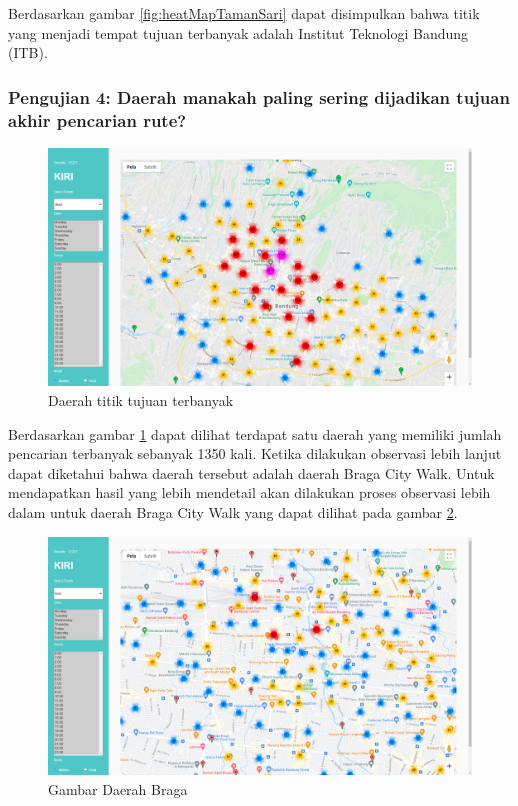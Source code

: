 Berdasarkan gambar \ref{fig:heatMapTamanSari} dapat disimpulkan bahwa titik yang menjadi tempat tujuan terbanyak adalah Institut Teknologi Bandung (ITB).

\subsubsection{Pengujian 4: Daerah manakah paling sering dijadikan tujuan akhir pencarian rute?}
\label{subsec:pengujian4}
\begin{figure}[H]
	\centering  
	\includegraphics[scale=0.3]{Gambar/pengujian/titik-tujuan-terbanyak.png}  
	\caption[Daerah titik tujuan terbanyak]{Daerah titik tujuan terbanyak} 
	\label{fig:titikTujuan}
\end{figure}

Berdasarkan gambar \ref{fig:titikTujuan} dapat dilihat terdapat satu daerah yang memiliki jumlah pencarian terbanyak sebanyak 1350 kali. Ketika dilakukan observasi lebih lanjut dapat diketahui bahwa daerah tersebut adalah daerah Braga City Walk. Untuk mendapatkan hasil yang lebih mendetail akan dilakukan proses observasi lebih dalam untuk daerah Braga City Walk yang dapat dilihat pada gambar \ref{fig:bragaZoom}.

\begin{figure}[H]
	\centering  
	\includegraphics[scale=0.3]{Gambar/pengujian/bragaZoom.png}  
	\caption[Gambar Daerah Braga ]{Gambar Daerah Braga } 
	\label{fig:bragaZoom}
\end{figure}

